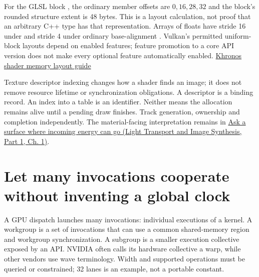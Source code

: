 For the GLSL block , the ordinary member offsets are \(0,16,28,32\) and the block's rounded structure extent is 48 bytes. This is a layout calculation, not proof that an arbitrary C++ type has that representation. Arrays of floats have stride 16 under  and stride 4 under ordinary base-alignment . Vulkan's permitted uniform-block layouts depend on enabled features; feature promotion to a core API version does not make every optional feature automatically enabled. \href{https://docs.vulkan.org/guide/latest/shader_memory_layout.html}{Khronos shader memory layout guide}

Texture descriptor indexing changes how a shader finds an image; it does not remove resource lifetime or synchronization obligations. A descriptor is a binding record. An index into a table is an identifier. Neither means the allocation remains alive until a pending draw finishes. Track generation, ownership and completion independently. The material-facing interpretation remains in \href{../04-Light-Transport-and-Image-Synthesis-P01/main.pdf\#03-visual-computing-i-ch005-ask-a-surface-where-incoming-energy-can-go}{Ask a surface where incoming energy can go (Light Transport and Image Synthesis, Part 1, Ch. 1)}.

\section{Let many invocations cooperate without inventing a global clock}\label{01-foundations-i-ch008-let-many-invocations-cooperate-without-inventing-a-global-clock}

\hypertarget{01-foundations-i-ch008-let-many-invocations-cooperate-without-inventing-a-global-clock}{}

A GPU dispatch launches many invocations: individual executions of a kernel. A workgroup is a set of invocations that can use a common shared-memory region and workgroup synchronization. A subgroup is a smaller execution collective exposed by an API. NVIDIA often calls its hardware collective a warp, while other vendors use wave terminology. Width and supported operations must be queried or constrained; 32 lanes is an example, not a portable constant.

